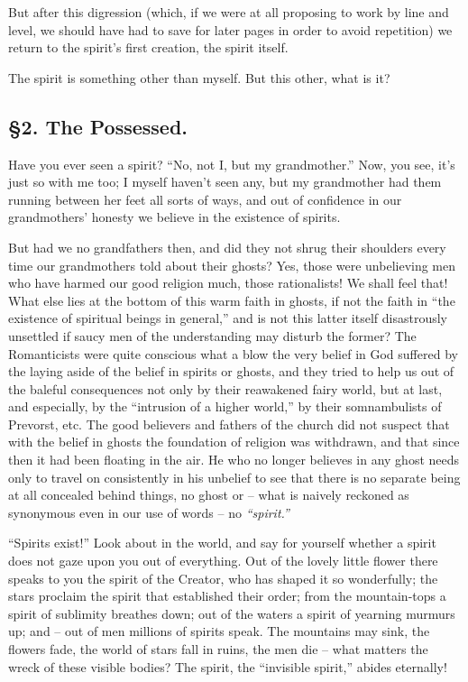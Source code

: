 But after this digression (which, if we were at all proposing to work by line 
and level, we should have had to save for later pages in order to avoid 
repetition) we return to the spirit's first creation, the spirit itself.

The spirit is something other than myself. But this other, what is it?

\medskip{}

\subsection[\S{}2. The Possessed]{\centering \S{}2. The Possessed.}

Have you ever seen a spirit? ``No, not I, but my grandmother.'' Now, you 
see, it's just so with me too; I myself haven't seen any, but my grandmother 
had them running between her feet all sorts of ways, and out of confidence in 
our grandmothers' honesty we believe in the existence of spirits.

But had we no grandfathers then, and did they not shrug their shoulders every 
time our grandmothers told about their ghosts? Yes, those were unbelieving men 
who have harmed our good religion much, those rationalists! We shall feel 
that! What else lies at the bottom of this warm faith in ghosts, if not the 
faith in ``the existence of spiritual beings in general,'' and is not this 
latter itself disastrously unsettled if saucy men of the understanding may 
disturb the former? The Romanticists were quite conscious what a blow the very 
belief in God suffered by the laying aside of the belief in spirits or ghosts, 
and they tried to help us out of the baleful consequences not only by their 
reawakened fairy world, but at last, and especially, by the ``intrusion of a 
higher world,'' by their somnambulists of Prevorst, etc. The good believers 
and fathers of the church did not suspect that with the belief in ghosts the 
foundation of religion was withdrawn, and that since then it had been floating 
in the air. He who no longer believes in any ghost needs only to travel on 
consistently in his unbelief to see that there is no separate being at all 
concealed behind things, no ghost or -- what is naively reckoned as synonymous 
even in our use of words -- no \textit{``spirit.''}

``Spirits exist!'' Look about in the world, and say for yourself whether a 
spirit does not gaze upon you out of everything. Out of the lovely little 
flower there speaks to you the spirit of the Creator, who has shaped it so 
wonderfully; the stars proclaim the spirit that established their order; from 
the mountain-tops a spirit of sublimity breathes down; out of the waters a 
spirit of yearning murmurs up; and -- out of men millions of spirits speak. 
The mountains may sink, the flowers fade, the world of stars fall in ruins, 
the men die -- what matters the wreck of these visible bodies? The spirit, the 
``invisible spirit,'' abides eternally!

